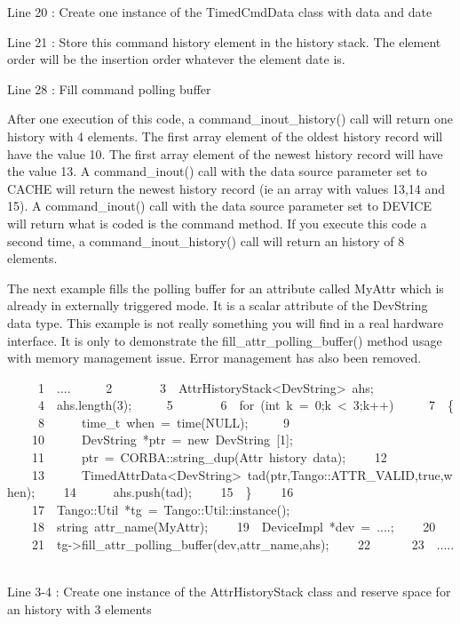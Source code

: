 Line 20 : Create one instance of the TimedCmdData class with data
and date

Line 21 : Store this command history element in the history stack.
The element order will be the insertion order whatever the element
date is.

Line 28 : Fill command polling buffer

After one execution of this code, a command\_inout\_history() call
will return one history with 4 elements. The first array element of
the oldest history record will have the value 10. The first array
element of the newest history record will have the value 13. A command\_inout()
call with the data source parameter set to CACHE will return the newest
history record (ie an array with values 13,14 and 15). A command\_inout()
call with the data source parameter set to DEVICE will return what
is coded is the command method. If you execute this code a second
time, a command\_inout\_history() call will return an history of 8
elements.

The next example fills the polling buffer for an attribute called
MyAttr which is already in externally triggered mode. It is a scalar
attribute of the DevString data type. This example is not really something
you will find in a real hardware interface. It is only to demonstrate
the fill\_attr\_polling\_buffer() method usage with memory management
issue. Error management has also been removed.



\begin{lyxcode}
~~~~~1~~....
~~~~~2~~
~~~~~3~~AttrHistoryStack<DevString>~ahs;
~~~~~4~~ahs.length(3);
~~~~~5~~
~~~~~6~~for~(int~k~=~0;k~<~3;k++)
~~~~~7~~\{
~~~~~8~~~~~~time\_t~when~=~time(NULL);
~~~~~9~~
~~~~10~~~~~~DevString~{*}ptr~=~new~DevString~{[}1{]};
~~~~11~~~~~~ptr~=~CORBA::string\_dup(\textquotedbl{}Attr~history~data\textquotedbl{});
~~~~12~~
~~~~13~~~~~~TimedAttrData<DevString>~tad(ptr,Tango::ATTR\_VALID,true,when);
~~~~14~~~~~~ahs.push(tad);
~~~~15~~\}
~~~~16~~
~~~~17~~Tango::Util~{*}tg~=~Tango::Util::instance();
~~~~18~~string~attr\_name(\textquotedbl{}MyAttr\textquotedbl{});
~~~~19~~DeviceImpl~{*}dev~=~....;
~~~~20~~
~~~~21~~tg->fill\_attr\_polling\_buffer(dev,attr\_name,ahs);
~~~~22~~
~~~~23~~.....
~~

\end{lyxcode}


Line 3-4 : Create one instance of the AttrHistoryStack class and reserve
space for an history with 3 elements

